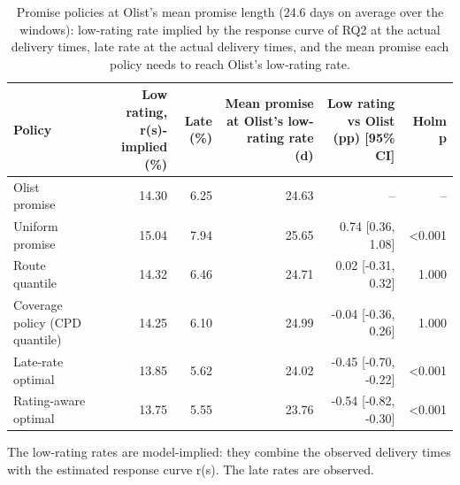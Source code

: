 \begin{table}[!htbp]
\centering
\footnotesize
\caption{Promise policies at Olist's mean promise length (24.6 days on average over the windows): low-rating rate implied by the response curve of RQ2 at the actual delivery times, late rate at the actual delivery times, and the mean promise each policy needs to reach Olist's low-rating rate.}
\label{tab:rq3}
\begin{tabular}{lrrrrr}
\toprule
Policy & Low rating, r(s)-implied (\%) & Late (\%) & Mean promise at Olist's low-rating rate (d) & Low rating vs Olist (pp) [95\% CI] & Holm p \\
\midrule
Olist promise & 14.30 & 6.25 & 24.63 & -- & -- \\
Uniform promise & 15.04 & 7.94 & 25.65 & 0.74 [0.36, 1.08] & <0.001 \\
Route quantile & 14.32 & 6.46 & 24.71 & 0.02 [-0.31, 0.32] & 1.000 \\
Coverage policy (CPD quantile) & 14.25 & 6.10 & 24.99 & -0.04 [-0.36, 0.26] & 1.000 \\
Late-rate optimal & 13.85 & 5.62 & 24.02 & -0.45 [-0.70, -0.22] & <0.001 \\
Rating-aware optimal & 13.75 & 5.55 & 23.76 & -0.54 [-0.82, -0.30] & <0.001 \\
\bottomrule
\end{tabular}
\par\smallskip
\parbox{\linewidth}{\scriptsize The low-rating rates are model-implied: they combine the observed delivery times with the estimated response curve r(s). The late rates are observed.}
\end{table}

